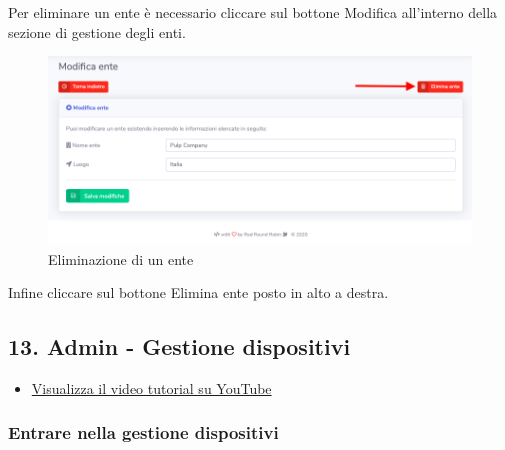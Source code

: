 		Per eliminare un ente è necessario cliccare sul bottone Modifica all'interno della sezione di gestione degli enti.

		\begin{figure}[H]
		\centering
		\includegraphics[scale=0.480]{res/images/admin/elimEnte.png}
		\caption{Eliminazione di un ente}
	\end{figure}


		Infine cliccare sul bottone Elimina ente posto in alto a destra.

	

\newpage \subsection{13. Admin - Gestione dispositivi}

	\begin{itemize}
		\item \href{https://www.youtube.com/watch?v=PjySMOLCtMA&list=PLPKYjnuIh1FA3b3jn_bwY_ztYzaFn2mIT&index=16}{Visualizza il video tutorial su YouTube} 
	\end{itemize}

	\subsubsection{Entrare nella gestione dispositivi}

